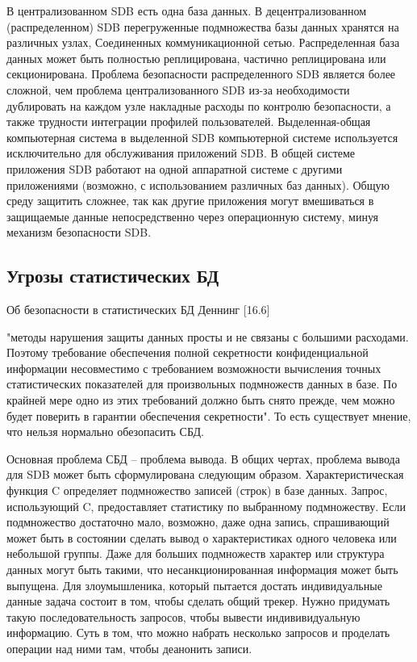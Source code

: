 \begin{itemize}
В централизованном SDB есть одна база данных. В децентрализованном (распределенном) SDB перегруженные подмножества базы данных хранятся на различных узлах, Соединенных коммуникационной сетью. Распределенная база данных может быть полностью реплицирована, частично реплицирована или секционирована. Проблема безопасности распределенного SDB является более сложной, чем проблема централизованного SDB из-за необходимости дублировать на каждом узле накладные расходы по контролю безопасности, а также трудности интеграции профилей пользователей.
Выделенная-общая компьютерная система в выделенной SDB компьютерной системе используется исключительно для обслуживания приложений SDB. В общей системе приложения SDB работают на одной аппаратной системе с другими приложениями (возможно, с использованием различных баз данных). Общую среду защитить сложнее, так как другие приложения могут вмешиваться в защищаемые данные непосредственно через операционную систему, минуя механизм безопасности SDB.
\end{itemize}
\subsection{Угрозы статистических БД}

Об безопасности в статистических БД  Деннинг [16.6]

"методы нарушения защиты данных просты и не связаны с большими расходами. Поэтому требование обеспечения полной секретности конфиденциальной информации несовместимо с требованием возможности вычисления точных статистических показателей для произвольных подмножеств данных в базе. По крайней мере одно из этих требований должно быть снято прежде, чем можно будет поверить в гарантии обеспечения секретности".
То есть существует мнение, что нельзя нормально обезопасить СБД.

Основная проблема СБД -- проблема вывода.
В общих чертах, проблема вывода для SDB может быть сформулирована следующим образом. Характеристическая функция C определяет подмножество записей (строк) в базе данных. Запрос, использующий C, предоставляет статистику по выбранному подмножеству. Если подмножество достаточно мало, возможно, даже одна запись, спрашивающий может быть в состоянии сделать вывод о характеристиках одного человека или небольшой группы. Даже для больших подмножеств характер или структура данных могут быть такими, что несанкционированная информация может быть выпущена.
Для злоумышленика, который пытается достать индивидуальные данные задача состоит в том, чтобы сделать общий трекер.
Нужно придумать такую последовательность запросов, чтобы вывести индививидуальную информацию.
Суть в том, что можно набрать несколько запросов и проделать операции над ними там, чтобы деанонить записи.

